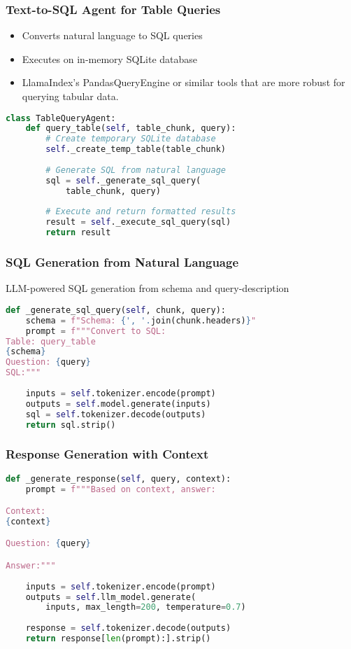 \begin{frame}[fragile]\frametitle{Text-to-SQL Agent for Table Queries}

\begin{itemize}
\item Converts natural language to SQL queries
\item Executes on in-memory SQLite database
\item LlamaIndex's PandasQueryEngine or similar tools that are more robust for querying tabular data.
\end{itemize}

\begin{lstlisting}[language=Python, basicstyle=\tiny]
class TableQueryAgent:
    def query_table(self, table_chunk, query):
        # Create temporary SQLite database
        self._create_temp_table(table_chunk)
        
        # Generate SQL from natural language
        sql = self._generate_sql_query(
            table_chunk, query)
        
        # Execute and return formatted results
        result = self._execute_sql_query(sql)
        return result
\end{lstlisting}

\end{frame}

\begin{frame}[fragile]\frametitle{SQL Generation from Natural Language}

LLM-powered SQL generation from schema and query-description

\begin{lstlisting}[language=Python, basicstyle=\tiny]
def _generate_sql_query(self, chunk, query):
    schema = f"Schema: {', '.join(chunk.headers)}"
    prompt = f"""Convert to SQL:
Table: query_table
{schema}
Question: {query}
SQL:"""
    
    inputs = self.tokenizer.encode(prompt)
    outputs = self.model.generate(inputs)
    sql = self.tokenizer.decode(outputs)
    return sql.strip()
\end{lstlisting}
\end{frame}

\begin{frame}[fragile]\frametitle{Response Generation with Context}
\begin{lstlisting}[language=Python, basicstyle=\tiny]
def _generate_response(self, query, context):
    prompt = f"""Based on context, answer:

Context:
{context}

Question: {query}

Answer:"""
    
    inputs = self.tokenizer.encode(prompt)
    outputs = self.llm_model.generate(
        inputs, max_length=200, temperature=0.7)
    
    response = self.tokenizer.decode(outputs)
    return response[len(prompt):].strip()
\end{lstlisting}
\end{frame}

